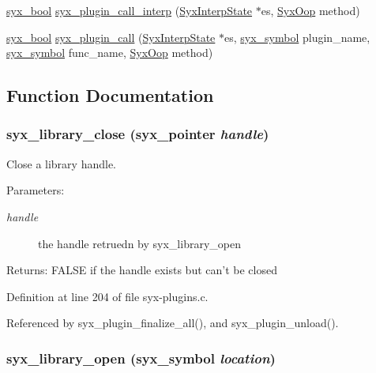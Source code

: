 \begin{CompactItemize}
\hyperlink{syx-types_8h_c6dc09b276b99fa1956364359139daab}{syx\_\-bool} \hyperlink{syx-plugins_8c_5f38432e4548b44f86339de097cc50c6}{syx\_\-plugin\_\-call\_\-interp} (\hyperlink{struct_syx_interp_state}{SyxInterpState} $\ast$es, \hyperlink{syx-types_8h_1121caba2d40b2ce090b640762744ccd}{SyxOop} method)
\item 
\hyperlink{syx-types_8h_c6dc09b276b99fa1956364359139daab}{syx\_\-bool} \hyperlink{syx-plugins_8c_5ab057c34bb472f81221770f79b90664}{syx\_\-plugin\_\-call} (\hyperlink{struct_syx_interp_state}{SyxInterpState} $\ast$es, \hyperlink{syx-types_8h_9663af54b7b72f5d8be5f754ef356525}{syx\_\-symbol} plugin\_\-name, \hyperlink{syx-types_8h_9663af54b7b72f5d8be5f754ef356525}{syx\_\-symbol} func\_\-name, \hyperlink{syx-types_8h_1121caba2d40b2ce090b640762744ccd}{SyxOop} method)
\end{CompactItemize}


\subsection{Function Documentation}
\hypertarget{syx-plugins_8c_a5b2684eeb91a217aac36985a65098f3}{
\subsubsection{ syx\_\-library\_\-close ({\bf syx\_\-pointer} {\em handle})}}
\label{syx-plugins_8c_a5b2684eeb91a217aac36985a65098f3}


Close a library handle.

\begin{Desc}
\item[Parameters:]
\begin{description}
\item[{\em handle}]the handle retruedn by syx\_\-library\_\-open \end{description}
\end{Desc}
\begin{Desc}
\item[Returns:]FALSE if the handle exists but can't be closed \end{Desc}


Definition at line 204 of file syx-plugins.c.

Referenced by syx\_\-plugin\_\-finalize\_\-all(), and syx\_\-plugin\_\-unload().\hypertarget{syx-plugins_8c_85042890723bb68c8c38269b24a452ff}{
\subsubsection{ syx\_\-library\_\-open ({\bf syx\_\-symbol} {\em location})}}
\label{syx-plugins_8c_85042890723bb68c8c38269b24a452ff}


